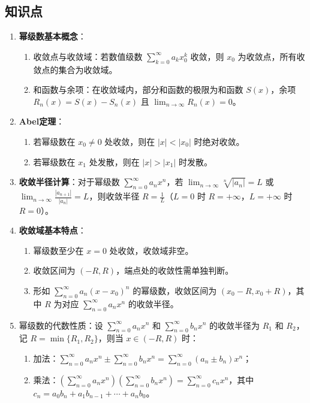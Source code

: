 \documentclass[UTF8]{ctexart}
\theoremstyle{remark}
\begin{document}
\subsection*{知识点}
\begin{enumerate}
	\item \textbf{幂级数基本概念}：
	\begin{enumerate}
		\item 收敛点与收敛域：若数值级数 \(\sum_{k=0}^{\infty}a_kx_0^k\) 收敛，则 \(x_0\) 为收敛点，所有收敛点的集合为收敛域。
		\item 和函数与余项：在收敛域内，部分和函数的极限为和函数 \(S(x)\)，余项 \(R_n(x)=S(x)-S_n(x)\) 且 \(\lim_{n\to\infty}R_n(x)=0\)。
	\end{enumerate}
	
	\item \textbf{Abel定理}：
	\begin{enumerate}
		\item 若幂级数在 \(x_0\neq0\) 处收敛，则在 \(|x|<|x_0|\) 时绝对收敛。
		\item 若幂级数在 \(x_1\) 处发散，则在 \(|x|>|x_1|\) 时发散。
	\end{enumerate}
	
	\item \textbf{收敛半径计算}：对于幂级数 \(\sum_{n=0}^{\infty}a_nx^n\)，若 \(\lim_{n\to\infty}\sqrt[n]{|a_n|}=L\) 或 \(\lim_{n\to\infty}\frac{|a_{n+1}|}{|a_n|}=L\)，则收敛半径 \(R=\frac{1}{L}\)（\(L=0\) 时 \(R=+\infty\)，\(L=+\infty\) 时 \(R=0\)）。
	
	\item \textbf{收敛域基本特点}：
	\begin{enumerate}
		\item 幂级数至少在 \(x=0\) 处收敛，收敛域非空。
		\item 收敛区间为 \((-R,R)\)，端点处的收敛性需单独判断。
		\item 形如 \(\sum_{n=0}^{\infty}a_n(x-x_0)^n\) 的幂级数，收敛区间为 \((x_0-R,x_0+R)\)，其中 \(R\) 为对应 \(\sum_{n=0}^{\infty}a_nx^n\) 的收敛半径。
	\end{enumerate}
	
	\item 幂级数的代数性质：设 \(\sum_{n=0}^{\infty}a_nx^n\) 和 \(\sum_{n=0}^{\infty}b_nx^n\) 的收敛半径为 \(R_1\) 和 \(R_2\)，记 \(R = \min\{R_1, R_2\}\)，则当 \(x \in (-R, R)\) 时：
	\begin{enumerate}
		\item 加法：\(\sum_{n=0}^{\infty}a_nx^n \pm \sum_{n=0}^{\infty}b_nx^n = \sum_{n=0}^{\infty}(a_n \pm b_n)x^n\)；
		\item 乘法：\(\left(\sum_{n=0}^{\infty}a_nx^n\right)\left(\sum_{n=0}^{\infty}b_nx^n\right) = \sum_{n=0}^{\infty}c_nx^n\)，其中 \(c_n = a_0b_n + a_1b_{n-1} + \cdots + a_nb_0\)。
	\end{enumerate}
	

\end{enumerate}
\end{document}
